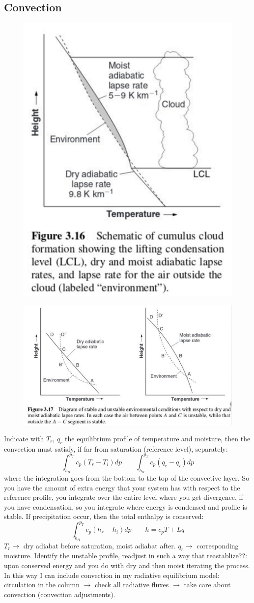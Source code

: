\subsection{Convection}\label{subsec:convection adjustments}
\begin{figure}[h!]
	\centering
	\includegraphics[width=0.5\linewidth]{uploads/Screenshot 2024-11-20 130640.png}
	\caption{}
	\label{fig:enter-label}
\end{figure}
\begin{figure}[h!]
	\centering
	\includegraphics[width=0.5\linewidth]{uploads/Screenshot 2024-11-20 130727.png}
	\caption{}
	\label{fig:enter-label}
\end{figure}
Indicate with $T_r$, $q_r$ the equilibrium profile of temperature and moisture, then the convection must satisfy, if far from saturation (reference level), separately:
$$\int_{b_B}^{p_T}c_p(T_r-T_i)dp \qquad \int_{b_B}^{p_T}c_p(q_r-q_i)dp$$
where the integration goes from the bottom to the top of the convective layer. So you have the amount of extra energy that your system has with respect to the reference profile, you integrate over the entire level where you get divergence, if you have condensation, so you integrate where energy is condensed and profile is stable.
If precipitation occur, then the total enthalpy is conserved:
$$\int_{b_B}^{p_T}c_p(h_r-h_i)dp \qquad h=c_pT+Lq$$
$T_r\rightarrow$ dry adiabat before saturation, moist adiabat after.
$q_r\rightarrow$ corresponding moisture.
Identify the unstable profile, readjust  in such a way that reastablize??: upon conserved energy and you do with dry and then moist iterating the process. In this way I can include convection in my radiative equilibrium model: circulation in the column $\rightarrow$ check all radiative fluxes $\rightarrow$ take care about convection (convection adjustments).
